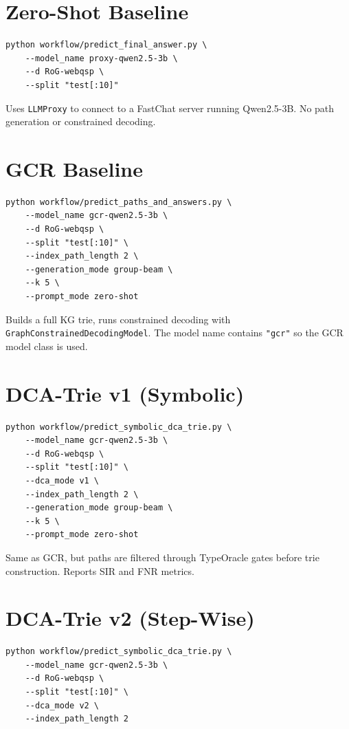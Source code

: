 \documentclass[11pt,a4paper,oneside,openany]{book}
\theoremstyle{definition}
\newcommand{\code}[1]{\texttt{#1}}
\begin{document}
\section{Zero-Shot Baseline}

\begin{lstlisting}[numbers=none,frame=none]
python workflow/predict_final_answer.py \
    --model_name proxy-qwen2.5-3b \
    --d RoG-webqsp \
    --split "test[:10]"
\end{lstlisting}

Uses \code{LLMProxy} to connect to a FastChat server running Qwen2.5-3B. No path generation or constrained decoding.

\section{GCR Baseline}

\begin{lstlisting}[numbers=none,frame=none]
python workflow/predict_paths_and_answers.py \
    --model_name gcr-qwen2.5-3b \
    --d RoG-webqsp \
    --split "test[:10]" \
    --index_path_length 2 \
    --generation_mode group-beam \
    --k 5 \
    --prompt_mode zero-shot
\end{lstlisting}

Builds a full KG trie, runs constrained decoding with \code{GraphConstrainedDecodingModel}. The model name contains \code{"gcr"} so the GCR model class is used.

\section{DCA-Trie v1 (Symbolic)}

\begin{lstlisting}[numbers=none,frame=none]
python workflow/predict_symbolic_dca_trie.py \
    --model_name gcr-qwen2.5-3b \
    --d RoG-webqsp \
    --split "test[:10]" \
    --dca_mode v1 \
    --index_path_length 2 \
    --generation_mode group-beam \
    --k 5 \
    --prompt_mode zero-shot
\end{lstlisting}

Same as GCR, but paths are filtered through TypeOracle gates before trie construction. Reports SIR and FNR metrics.

\section{DCA-Trie v2 (Step-Wise)}

\begin{lstlisting}[numbers=none,frame=none]
python workflow/predict_symbolic_dca_trie.py \
    --model_name gcr-qwen2.5-3b \
    --d RoG-webqsp \
    --split "test[:10]" \
    --dca_mode v2 \
    --index_path_length 2
\end{lstlisting}
\end{document}
